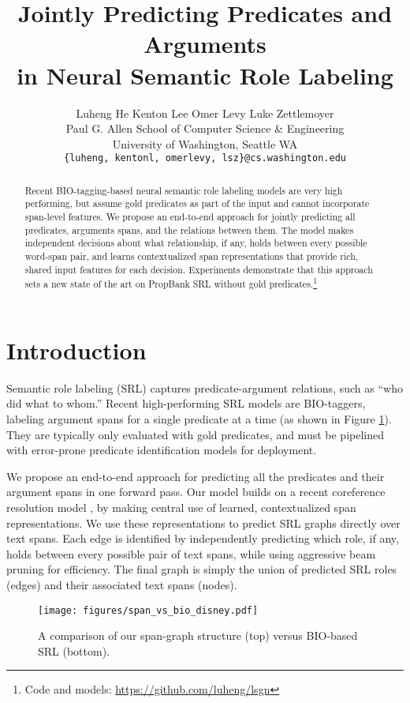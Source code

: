\documentclass[11pt,a4paper]{article}
\title{Jointly Predicting Predicates and Arguments\\ in Neural Semantic Role Labeling}
\author{Luheng He \qquad Kenton Lee \qquad Omer Levy \qquad Luke Zettlemoyer\\
  Paul G. Allen School of Computer Science \& Engineering \\
  University of Washington, Seattle WA \\
  {\tt \{luheng, kentonl, omerlevy, lsz\}@cs.washington.edu}}
\date{}
\date{}
\begin{document}
\maketitle
\begin{abstract}
Recent BIO-tagging-based neural semantic role labeling models are 
very high performing, but assume gold predicates as part of the input and cannot incorporate span-level features. 
We propose an end-to-end approach for jointly predicting all predicates, arguments spans, and the relations between them. 
The model makes independent decisions about what relationship, if any, holds between every possible word-span pair, and learns contextualized span representations that provide rich, shared input features for each decision. 
Experiments demonstrate that this approach sets a new state of the art on PropBank SRL without gold predicates.\footnote{Code and models: \href{https://github.com/luheng/lsgn}{https://github.com/luheng/lsgn}}
\end{abstract}


\section{Introduction}

Semantic role labeling (SRL) captures predicate-argument relations, such as ``who did what to whom.''
Recent high-performing SRL models \cite{He2017DeepSR,Marcheggiani2017ASA, tan2018deep} are BIO-taggers, labeling argument spans for a single predicate at a time (as shown in Figure \ref{fig:intro_example}).
They are typically only evaluated with gold predicates, and must be pipelined with error-prone predicate identification models for deployment.

We propose an end-to-end approach for predicting all the predicates and their argument spans in one forward pass.
Our model builds on a recent coreference resolution model \cite{Lee2017EndtoendNC}, by making central use of learned, contextualized span representations. We use these representations to predict SRL graphs directly over text spans. 
Each edge is identified by independently predicting which role, if any, holds between every possible pair of text spans, while using aggressive beam pruning for efficiency. The final graph is simply the union of predicted SRL roles (edges) and their associated text spans (nodes). 

\begin{figure}[t]
\centering
\texttt{[image: figures/span\_vs\_bio\_disney.pdf]}
\vspace{-1.5em}
\caption{
A comparison of our span-graph structure (top) versus BIO-based SRL (bottom).}\label{fig:intro_example}
\vspace{-1em}
\end{figure}
\end{document}
